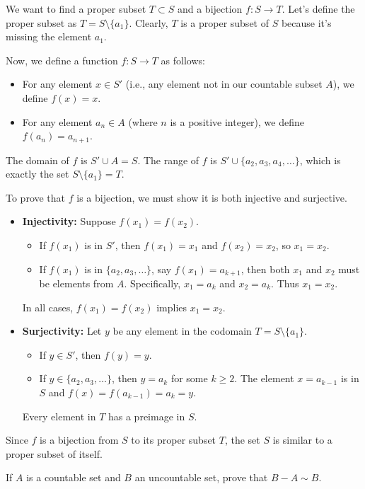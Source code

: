 We want to find a proper subset $T \subset S$ and a bijection $f: S \to T$.
Let's define the proper subset as $T = S \setminus \{a_1\}$. Clearly, $T$ is a proper subset of $S$ because it's missing the element $a_1$.

Now, we define a function $f: S \to T$ as follows:
\begin{itemize}
\item For any element $x \in S'$ (i.e., any element not in our countable subset $A$), we define $f(x) = x$.
\item For any element $a_n \in A$ (where $n$ is a positive integer), we define $f(a_n) = a_{n+1}$.
\end{itemize}
The domain of $f$ is $S' \cup A = S$. The range of $f$ is $S' \cup \{a_2, a_3, a_4, \dots\}$, which is exactly the set $S \setminus \{a_1\} = T$.

To prove that $f$ is a bijection, we must show it is both injective and surjective.
\begin{itemize}
\item \textbf{Injectivity:} Suppose $f(x_1) = f(x_2)$.
\begin{itemize}
\item If $f(x_1)$ is in $S'$, then $f(x_1)=x_1$ and $f(x_2)=x_2$, so $x_1=x_2$.
\item If $f(x_1)$ is in $\{a_2, a_3, \dots\}$, say $f(x_1) = a_{k+1}$, then both $x_1$ and $x_2$ must be elements from $A$. Specifically, $x_1 = a_k$ and $x_2 = a_k$. Thus $x_1=x_2$.
\end{itemize}
In all cases, $f(x_1)=f(x_2)$ implies $x_1=x_2$.
\item \textbf{Surjectivity:} Let $y$ be any element in the codomain $T = S \setminus \{a_1\}$.
\begin{itemize}
\item If $y \in S'$, then $f(y) = y$.
\item If $y \in \{a_2, a_3, \dots\}$, then $y=a_k$ for some $k \geq 2$. The element $x=a_{k-1}$ is in $S$ and $f(x) = f(a_{k-1}) = a_k = y$.
\end{itemize}
Every element in $T$ has a preimage in $S$.
\end{itemize}
Since $f$ is a bijection from $S$ to its proper subset $T$, the set $S$ is similar to a proper subset of itself.


\begin{problembox}
If \( A \) is a countable set and \( B \) an uncountable set, prove that \( B - A \sim B \).
\end{problembox}


